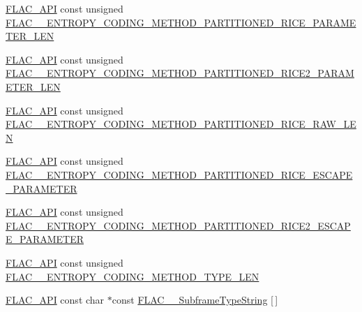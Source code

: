 \begin{DoxyCompactItemize}
\item 
\mbox{\hyperlink{group__flac__export_ga56ca07df8a23310707732b1c0007d6f5}{F\+L\+A\+C\+\_\+\+A\+PI}} const unsigned \mbox{\hyperlink{group__flac__format_ga1b66dd050e207a941555dd1a5dd184d3}{F\+L\+A\+C\+\_\+\+\_\+\+E\+N\+T\+R\+O\+P\+Y\+\_\+\+C\+O\+D\+I\+N\+G\+\_\+\+M\+E\+T\+H\+O\+D\+\_\+\+P\+A\+R\+T\+I\+T\+I\+O\+N\+E\+D\+\_\+\+R\+I\+C\+E\+\_\+\+P\+A\+R\+A\+M\+E\+T\+E\+R\+\_\+\+L\+EN}}
\item 
\mbox{\hyperlink{group__flac__export_ga56ca07df8a23310707732b1c0007d6f5}{F\+L\+A\+C\+\_\+\+A\+PI}} const unsigned \mbox{\hyperlink{group__flac__format_ga9266ba16c700a7c7600d7ed57a1b0d8e}{F\+L\+A\+C\+\_\+\+\_\+\+E\+N\+T\+R\+O\+P\+Y\+\_\+\+C\+O\+D\+I\+N\+G\+\_\+\+M\+E\+T\+H\+O\+D\+\_\+\+P\+A\+R\+T\+I\+T\+I\+O\+N\+E\+D\+\_\+\+R\+I\+C\+E2\+\_\+\+P\+A\+R\+A\+M\+E\+T\+E\+R\+\_\+\+L\+EN}}
\item 
\mbox{\hyperlink{group__flac__export_ga56ca07df8a23310707732b1c0007d6f5}{F\+L\+A\+C\+\_\+\+A\+PI}} const unsigned \mbox{\hyperlink{group__flac__format_gac4552a7a6b9c771ee47ee51fa998ca5f}{F\+L\+A\+C\+\_\+\+\_\+\+E\+N\+T\+R\+O\+P\+Y\+\_\+\+C\+O\+D\+I\+N\+G\+\_\+\+M\+E\+T\+H\+O\+D\+\_\+\+P\+A\+R\+T\+I\+T\+I\+O\+N\+E\+D\+\_\+\+R\+I\+C\+E\+\_\+\+R\+A\+W\+\_\+\+L\+EN}}
\item 
\mbox{\hyperlink{group__flac__export_ga56ca07df8a23310707732b1c0007d6f5}{F\+L\+A\+C\+\_\+\+A\+PI}} const unsigned \mbox{\hyperlink{group__flac__format_ga176b89e2ee2e08d0790bfbab2fa213a0}{F\+L\+A\+C\+\_\+\+\_\+\+E\+N\+T\+R\+O\+P\+Y\+\_\+\+C\+O\+D\+I\+N\+G\+\_\+\+M\+E\+T\+H\+O\+D\+\_\+\+P\+A\+R\+T\+I\+T\+I\+O\+N\+E\+D\+\_\+\+R\+I\+C\+E\+\_\+\+E\+S\+C\+A\+P\+E\+\_\+\+P\+A\+R\+A\+M\+E\+T\+ER}}
\item 
\mbox{\hyperlink{group__flac__export_ga56ca07df8a23310707732b1c0007d6f5}{F\+L\+A\+C\+\_\+\+A\+PI}} const unsigned \mbox{\hyperlink{group__flac__format_ga08bc0c9e0fd088cbea13bc3b11c4d4d4}{F\+L\+A\+C\+\_\+\+\_\+\+E\+N\+T\+R\+O\+P\+Y\+\_\+\+C\+O\+D\+I\+N\+G\+\_\+\+M\+E\+T\+H\+O\+D\+\_\+\+P\+A\+R\+T\+I\+T\+I\+O\+N\+E\+D\+\_\+\+R\+I\+C\+E2\+\_\+\+E\+S\+C\+A\+P\+E\+\_\+\+P\+A\+R\+A\+M\+E\+T\+ER}}
\item 
\mbox{\hyperlink{group__flac__export_ga56ca07df8a23310707732b1c0007d6f5}{F\+L\+A\+C\+\_\+\+A\+PI}} const unsigned \mbox{\hyperlink{group__flac__format_ga1d49716deb8775a027f78b059b61c2e0}{F\+L\+A\+C\+\_\+\+\_\+\+E\+N\+T\+R\+O\+P\+Y\+\_\+\+C\+O\+D\+I\+N\+G\+\_\+\+M\+E\+T\+H\+O\+D\+\_\+\+T\+Y\+P\+E\+\_\+\+L\+EN}}
\item 
\mbox{\hyperlink{group__flac__export_ga56ca07df8a23310707732b1c0007d6f5}{F\+L\+A\+C\+\_\+\+A\+PI}} const char $\ast$const \mbox{\hyperlink{group__flac__format_gabc358f252630dfc52e875eb05c3b0fd9}{F\+L\+A\+C\+\_\+\+\_\+\+Subframe\+Type\+String}} \mbox{[}$\,$\mbox{]}

\end{DoxyCompactItemize}
